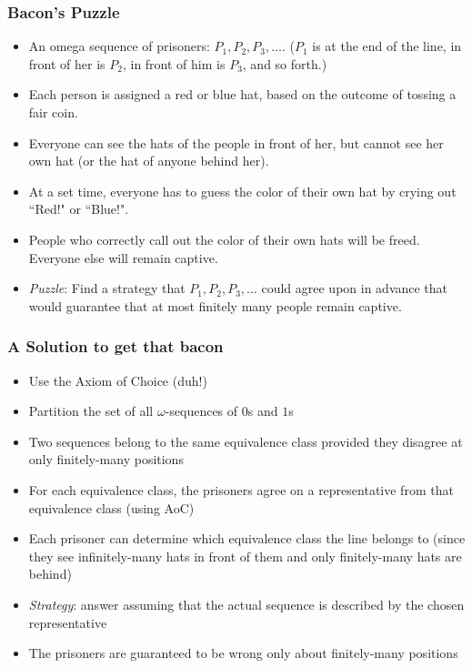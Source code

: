 \begin{frame}
\frametitle{Bacon's Puzzle}

\begin{itemize}[<+->]

\item An omega sequence of prisoners: \(P_1,P_2,P_3,\dots\). (\(P_1\) is at the end of the line, in front of her is \(P_2\), in front of him is \(P_3\), and so forth.) 

\item Each person is assigned a red or blue hat, based on the outcome of tossing a fair coin. 

\item Everyone can see the hats of the people in front of her, but cannot see her own hat (or the hat of anyone behind her). 

\item At a set time, everyone has to guess the color of their own hat by crying out ``Red!" or ``Blue!".

\item People who correctly call out the color of their own hats will be freed. Everyone else will remain captive. 

\item \emph{Puzzle}: Find a strategy that \(P_1, P_2, P_3, \ldots\) could agree upon in advance that would guarantee that at most finitely many people remain captive. 

\end{itemize}
\end{frame}

\begin{frame}
\frametitle{A Solution to get that bacon}

\begin{itemize}[<+->]
\item Use the Axiom of Choice (duh!)

\item Partition the set of all $\omega$-sequences of $0$s and $1$s

\item Two sequences belong to the same equivalence class provided they disagree at only finitely-many positions

\item For each equivalence class, the prisoners agree on a representative from that equivalence class (using AoC)

\item Each prisoner can determine which equivalence class the line belongs to (since they see infinitely-many hats in front of them and only finitely-many hats are behind)

\item \textit{Strategy}: answer assuming that the actual sequence is described by the chosen representative

\item The prisoners are guaranteed to be wrong only about finitely-many positions


\end{itemize}
\end{frame}


